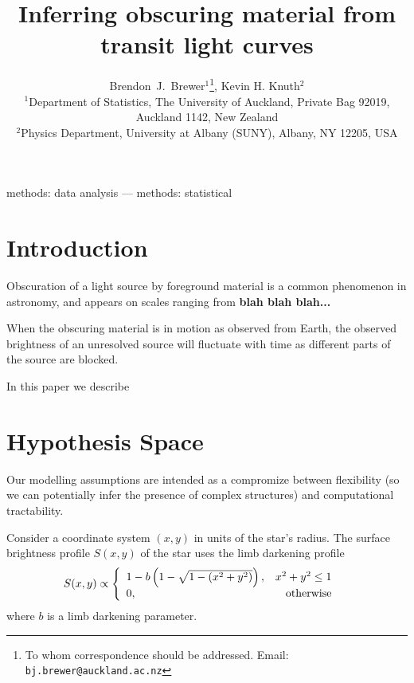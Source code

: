 \documentclass[a4paper,fleqn,usenatbib]{mnras}
\title[]
{Inferring obscuring material from transit light curves}
\author[Brewer and Knuth]{%
  Brendon~J.~Brewer$^{1}$\thanks{To whom correspondence should be addressed. Email: {\tt bj.brewer@auckland.ac.nz}},
  Kevin H. Knuth$^2$
  \medskip\\
  $^1$Department of Statistics, The University of Auckland, Private Bag 92019,
        Auckland 1142, New Zealand\\
  $^2$Physics Department, University at Albany (SUNY), Albany, NY 12205, USA}
\date{}
\begin{document}
\label{firstpage}
\pagerange{\pageref{firstpage}--\pageref{lastpage}}
\maketitle

\begin{abstract}
\end{abstract}

\begin{keywords}
methods: data analysis --- methods: statistical
\end{keywords}



\section{Introduction}
Obscuration of a light source by foreground material is a common
phenomenon in astronomy, and appears on scales ranging from
{\bf blah blah blah...}

When the obscuring material is in motion as observed from Earth,
the observed brightness of an unresolved source will fluctuate with time
as different parts of the source are blocked.

In this paper we describe 



\section{Hypothesis Space}
Our modelling assumptions are intended as a compromize between flexibility
(so we can potentially infer the presence of complex structures)
and computational tractability.

Consider a coordinate system $(x,y)$ in units of the star's radius.
The surface brightness profile
$S(x, y)$ of the star uses the limb darkening profile
\begin{align}
S(x, y) &\propto
    \left\{
        \begin{array}{lr}
            1 - b\left(1 - \sqrt{1 - (x^2 + y^2)}\right),   & x^2+y^2 \leq 1\\
            0, & \textnormal{otherwise}
        \end{array}
    \right.
\end{align}
where $b$ is a limb darkening parameter.
\end{document}
